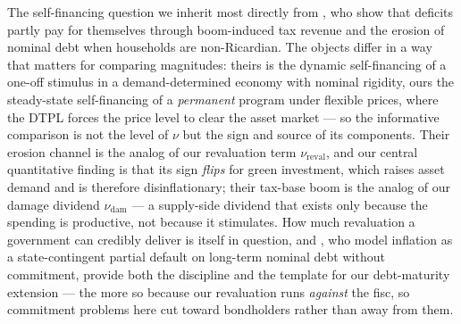 \documentclass[12pt]{article}
\begin{document}
The self-financing question we inherit most directly from
\citet{angeletos2024deficits}, who show that deficits partly pay for themselves
through boom-induced tax revenue and the erosion of nominal debt when
households are non-Ricardian. The objects differ in a way that matters for
comparing magnitudes: theirs is the dynamic self-financing of a one-off
stimulus in a demand-determined economy with nominal rigidity, ours the
steady-state self-financing of a \emph{permanent} program under flexible
prices, where the DTPL forces the price level to clear the asset market ---
so the informative comparison is not the level of $\nu$ but the sign and
source of its components. Their erosion channel is the analog of
our revaluation term $\nu_{\mathrm{reval}}$, and our central quantitative
finding is that its sign \emph{flips} for green investment, which raises asset
demand and is therefore disinflationary; their tax-base boom is the analog of
our damage dividend $\nu_{\mathrm{dam}}$ --- a supply-side dividend that
exists only because the spending is productive, not because it stimulates. How much revaluation a government can
credibly deliver is itself in question, and \citet{hurtado2023sovereign}, who
model inflation as a state-contingent partial default on long-term nominal debt
without commitment, provide both the discipline and the template for our
debt-maturity extension --- the more so because our revaluation runs
\emph{against} the fisc, so commitment problems here cut toward bondholders
rather than away from them.
\end{document}
